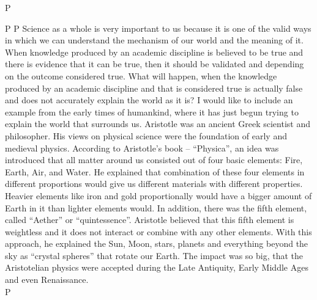 P \documentclass[12pt,a4paper]{article}
\begin{document}
P 
P Science as a whole is very important to us because it is one of the valid ways in which we can understand the mechanism of our world and the meaning of it. When knowledge produced by an academic discipline is believed to be true and there is evidence that it can be true, then it should be validated and depending on the outcome considered true. What will happen, when the knowledge produced by an academic discipline and that is considered true is actually false and does not accurately explain the world as it is? I would like to include an example from the early times of humankind, where it has just begun trying to explain the world that surrounds us. Aristotle was an ancient Greek scientist and philosopher. His views on physical science were the foundation of early and medieval physics. According to Aristotle’s book – “Physica”, an idea was introduced that all matter around us consisted out of four basic elements: Fire, Earth, Air, and Water\cite{aether}. He explained that combination of these four elements in different proportions would give us different materials with different properties. Heavier elements like iron and gold proportionally would have a bigger amount of Earth in it than lighter elements would. In addition, there was the fifth element, called “Aether” or “quintessence”. Aristotle believed that this fifth element is weightless and it does not interact or combine with any other elements. With this approach, he explained the Sun, Moon, stars, planets and everything beyond the sky as “crystal spheres” that rotate our Earth. The impact was so big, that the Aristotelian physics were accepted during the Late Antiquity, Early Middle Ages and even Renaissance. \\
P 
\end{document}
